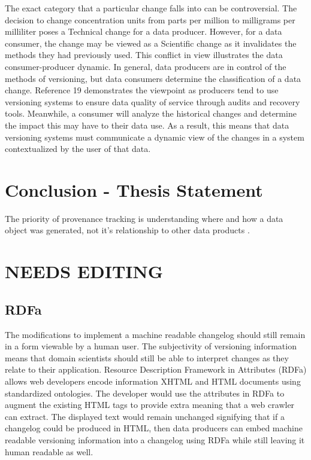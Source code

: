 The exact category that a particular change falls into can be controversial.
The decision to change concentration units from parts per million to milligrams per milliliter poses a Technical change for a data producer.
However, for a data consumer, the change may be viewed as a Scientific change as it invalidates the methods they had previously used.
This conflict in view illustrates the data consumer-producer dynamic.
In general, data producers are in control of the methods of versioning, but data consumers determine the classification of a data change.
Reference 19 demonstrates the viewpoint as producers tend to use versioning systems to ensure data quality of service through audits and recovery tools.
Meanwhile, a consumer will analyze the historical changes and determine the impact this may have to their data use.
As a result, this means that data versioning systems must communicate a dynamic view of the changes in a system contextualized by the user of that data.

\section{Conclusion - Thesis Statement}
The priority of provenance tracking is understanding where and how a data object was generated, not it's relationship to other data products \cite{Bose:2005:LRS:1057977.1057978}.

\section{NEEDS EDITING}

\subsection{RDFa}

The modifications to implement a machine readable changelog should still remain in a form viewable by a human user.
The subjectivity of versioning information means that domain scientists should still be able to interpret changes as they relate to their application.
Resource Description Framework in Attributes (RDFa) allows web developers encode information XHTML and HTML documents using standardized ontologies.
The developer would use the attributes in RDFa to augment the existing HTML tags to provide extra meaning that a web crawler can extract.
The displayed text would remain unchanged signifying that if a changelog could be produced in HTML, then data producers can embed machine readable versioning information into a changelog using RDFa while still leaving it human readable as well.


